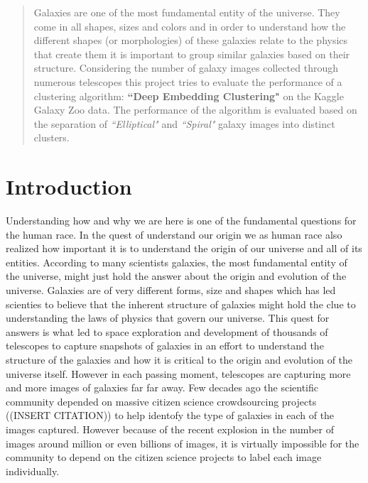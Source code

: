 \documentclass{article}
\begin{document}
\begin{abstract}
Galaxies are one of the most fundamental entity of the universe. They come in all shapes, sizes and colors and 
in order to understand how the different shapes (or morphologies) of these galaxies relate to the physics that 
create them it is important to group similar galaxies based on their structure. Considering the number of galaxy 
images collected through numerous telescopes this project tries to evaluate the performance of a clustering 
algorithm: \textbf{``Deep Embedding Clustering"} on the Kaggle Galaxy Zoo data. The performance of the algorithm 
is evaluated based on the separation of \textit{``Elliptical"} and \textit{``Spiral"} galaxy images into distinct clusters.
\end{abstract}

















\section{Introduction}
\label{introduction}
Understanding how and why we are here is one of the fundamental questions for the human race. In the quest of understand our origin we as human race also realized how important it is to understand the origin of our universe and all of its entities. According to many scientists galaxies, the most fundamental entity of the universe, might just hold the answer about the origin and evolution of the universe. Galaxies are of very different forms, size and shapes which has led scienties to believe that the inherent structure of galaxies might hold the clue to understanding the laws of physics that govern our universe. This quest for answers is what led to space exploration and development of thousands of telescopes to capture snapshots of galaxies in an effort to understand the structure of the galaxies and how it is critical to the origin and evolution of the universe itself. However in each passing moment, telescopes are capturing more and more images of galaxies far far away. Few decades ago the scientific community depended on massive citizen science crowdsourcing projects ((INSERT CITATION)) to help identofy the type of galaxies in each of the images captured. However because of the recent explosion in the number of images around million or even billions of images, it is virtually impossible for the community to depend on the citizen science projects to label each image individually. 
\end{document}
